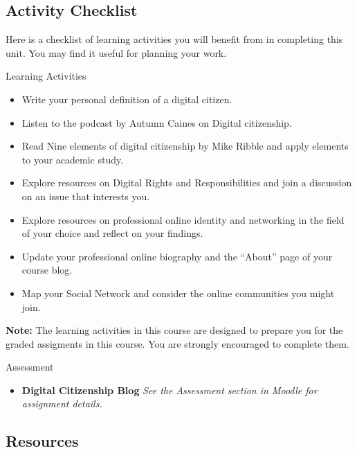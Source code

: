\documentclass[
]{book}
\providecommand{\tightlist}{%
  \setlength{\itemsep}{0pt}\setlength{\parskip}{0pt}}
\theoremstyle{definition}
\theoremstyle{definition}
\theoremstyle{definition}
\theoremstyle{definition}
\theoremstyle{remark}
\begin{document}
\hypertarget{activity-checklist-4}{%
\subsection*{Activity Checklist}\label{activity-checklist-4}}

Here is a checklist of learning activities you will benefit from in completing this unit. You may find it useful for planning your work.

\begin{reflect}
{Learning Activities}

\begin{itemize}
\tightlist
\item
  Write your personal definition of a digital citizen.
\item
  Listen to the podcast by Autumn Caines on Digital citizenship.
\item
  Read Nine elements of digital citizenship by Mike Ribble and apply elements to your academic study.
\item
  Explore resources on Digital Rights and Responsibilities and join a discussion on an issue that interests you.
\item
  Explore resources on professional online identity and networking in the field of your choice and reflect on your findings.
\item
  Update your professional online biography and the ``About'' page of your course blog.
\item
  Map your Social Network and consider the online communities you might join.
\end{itemize}

\textbf{Note:} The learning activities in this course are designed to prepare you for the graded assigments in this course. You are strongly encouraged to complete them.
\end{reflect}

\begin{assessment}
{Assessment}

\begin{itemize}
\tightlist
\item
  \textbf{Digital Citizenship Blog}
  \emph{See the Assessment section in Moodle for assignment details.}
\end{itemize}
\end{assessment}

\hypertarget{resources-4}{%
\subsection*{Resources}\label{resources-4}}
\end{document}
